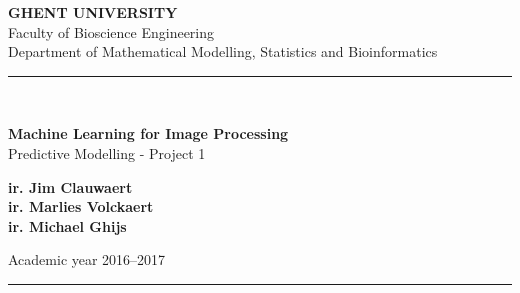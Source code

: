 

\begin{titlepage}
	\begin{center}
		{\Large\bf GHENT UNIVERSITY}\\[.5cm]
		{\Large Faculty of Bioscience Engineering}\\[.5cm]
		{\Large Department of Mathematical Modelling, Statistics and Bioinformatics}\\[.5cm]
		\hrule{\ }\\[.4cm]
	
		\vspace{4cm}
\begin{mdframed}[style=warning]
		\vspace{1cm}
\centering
		{{\huge \bf Machine Learning for Image Processing}}\\[1cm]
		{\LARGE Predictive Modelling - Project 1}
		\vspace{1cm}
\end{mdframed}
		\vspace{3cm}


	\end{center}
	
	\begin{center}
		{\large \bf ir. Jim Clauwaert\\[.2cm]
		\large \bf ir. Marlies Volckaert\\[.2cm]
		\large \bf ir. Michael Ghijs\\[.2cm]
		}%
		
		\vfill
		Academic year 2016--2017\\[.3cm]
		\hrule \vspace{.3cm}
	\end{center}
\end{titlepage}







